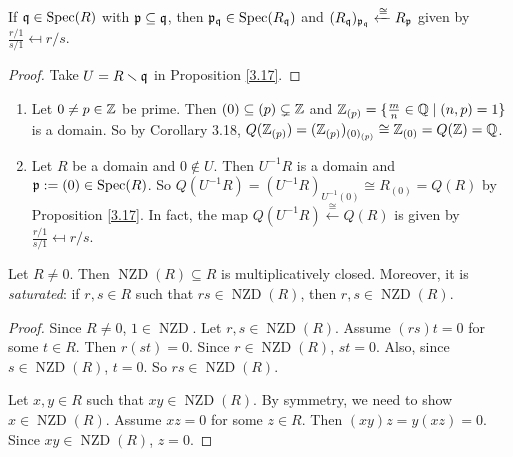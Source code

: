 \begin{corollary}\label{3.18}
    If $\mathfrak{q} \in \operatorname{Spec}(R)$ with $\mathfrak{p} \subseteq \mathfrak{q}$, then $\mathfrak{p}_{\mathfrak{q}} \in \operatorname{Spec}(R_{\mathfrak{q}})$ and $(R_{\mathfrak{q}})_{\mathfrak{p}_{\mathfrak{q}}} \xleftarrow \cong R_{\mathfrak{p}}$ given by $\frac{r/1}{s/1} \mapsfrom r/s$.
\end{corollary}

\begin{proof}
    Take $U = R \smallsetminus \mathfrak{q}$ in Proposition \ref{3.17}.
\end{proof}

\begin{example*}
    \begin{enumerate}
        \item Let $0 \neq p \in \mathbb{Z}$ be prime. Then $(0) \subseteq (p) \subsetneq \mathbb{Z}$ and $\mathbb{Z}_{(p)} = \{\frac{m}{n} \in \mathbb{Q} \mid (n,p) = 1\}$ is a domain. So by Corollary 3.18, $Q(\mathbb{Z}_{(p)}) = (\mathbb{Z}_{(p)})_{(0)_{(p)}} \cong \mathbb{Z}_{(0)} = Q(\mathbb{Z}) = \mathbb{Q}$. 
        \item Let $R$ be a domain and $0 \not \in U$. Then $U^{-1}R$ is a domain and $\mathfrak{p} := (0) \in \operatorname{Spec}(R)$. So $Q(U^{-1}R) = (U^{-1}R)_{U^{-1}(0)} \cong R_{(0)} = Q(R)$ by Proposition \ref{3.17}. In fact, the map $Q(U^{-1}R) \xleftarrow \cong Q(R)$ is given by $\frac{r/1}{s/1} \mapsfrom r/s$.
    \end{enumerate}
\end{example*}

\begin{proposition}\label{3.19}
    Let $R \neq 0$. Then $\operatorname{NZD}(R) \subseteq R$ is multiplicatively closed. Moreover, it is \emph{saturated}: if $r,s \in R$ such that $rs \in \operatorname{NZD}(R)$, then $r,s \in \operatorname{NZD}(R)$. 
\end{proposition}

\begin{proof}
    Since $R \neq 0$, $1 \in \operatorname{NZD}$. Let $r,s \in \operatorname{NZD}(R)$. Assume $(rs)t=0$ for some $t \in R$. Then $r(st) = 0$. Since $r \in \operatorname{NZD}(R)$, $st = 0$. Also, since $s \in \operatorname{NZD}(R)$, $t = 0$. So $rs \in \operatorname{NZD}(R)$. \par 
    Let $x,y \in R$ such that $xy \in \operatorname{NZD}(R)$. By symmetry, we need to show $x \in \operatorname{NZD}(R)$. Assume $xz = 0$ for some $z \in R$. Then $(xy)z = y(xz) = 0$. Since $xy \in \operatorname{NZD}(R)$, $z = 0$.
\end{proof}

